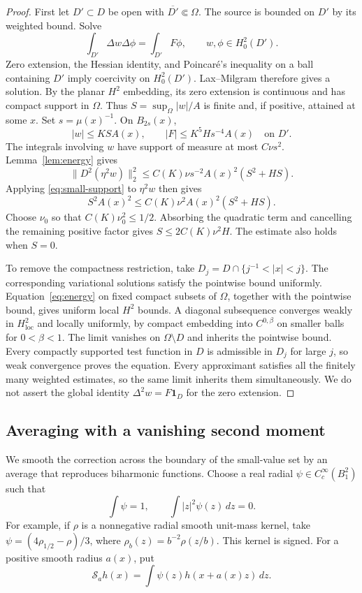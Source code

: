 \documentclass[11pt,twoside,leqno]{article}
\numberwithin{equation}{section}
\theoremstyle{definition}
\theoremstyle{remark}
\newcommand{\loc}{\mathrm{loc}}
\newcommand{\Om}{\Omega}
\begin{document}
\begin{proof}
First let $D'\subset D$ be open with $\overline{D'}\Subset\Om$.
The source is bounded on $D'$ by its weighted bound. Solve
\[
 \int_{D'}\Delta w\Delta\phi=\int_{D'}F\phi,
 \qquad w,\phi\in H^2_0(D').
\]
Zero extension, the Hessian identity, and Poincar\'e's inequality on
a ball containing $D'$ imply coercivity on $H^2_0(D')$.
Lax--Milgram therefore gives a solution. By the planar $H^2$ embedding,
its zero extension is continuous and has compact support in $\Om$.
Thus $S=\sup_\Om|w|/A$ is finite and, if positive, attained at some
$x$. Set $s=\mu(x)^{-1}$. On $B_{2s}(x)$,
\[
 |w|\le KSA(x),\qquad |F|\le K^5Hs^{-4}A(x)\quad\text{on }D'.
\]
The integrals involving $w$ have support of measure at most $C\nu s^2$.
Lemma~\ref{lem:energy} gives
\[
 \|D^2(\eta^2w)\|_2^2
 \le C(K)\nu s^{-2}A(x)^2(S^2+HS).
\]
Applying \eqref{eq:small-support} to $\eta^2w$ then gives
\[
 S^2A(x)^2\le C(K)\nu^2A(x)^2(S^2+HS).
\]
Choose $\nu_0$ so that $C(K)\nu_0^2\le1/2$. Absorbing the quadratic
term and cancelling the remaining positive factor gives
$S\le2C(K)\nu^2H$. The estimate also holds when $S=0$.

To remove the compactness restriction, take
$D_j=D\cap\{j^{-1}<|x|<j\}$. The corresponding variational solutions
satisfy the pointwise bound uniformly. Equation~\eqref{eq:energy}
on fixed compact subsets of $\Om$, together with the pointwise bound,
gives uniform local $H^2$ bounds. A diagonal subsequence converges weakly
in $H^2_{\loc}$ and locally uniformly, by compact embedding into
$C^{0,\beta}$ on smaller balls for $0<\beta<1$.
The limit vanishes on $\Om\setminus D$ and inherits the pointwise
bound. Every compactly supported test function in $D$ is admissible
in $D_j$ for large $j$, so weak convergence proves the equation.
Every approximant satisfies all the finitely many weighted estimates,
so the same limit inherits them simultaneously. We do not assert the
global identity $\Delta^2w=F\mathbf1_D$ for the zero extension.
\end{proof}

\subsection{Averaging with a vanishing second moment}

We smooth the correction across the boundary of the small-value set
by an average that reproduces biharmonic functions.
Choose a real radial $\psi\in C_c^\infty(B_1^2)$ such that
\begin{equation}\label{eq:moments}
 \int\psi=1,\qquad \int|z|^2\psi(z)\,dz=0.
\end{equation}
For example, if $\rho$ is a nonnegative radial smooth unit-mass kernel,
take $\psi=(4\rho_{1/2}-\rho)/3$, where
$\rho_b(z)=b^{-2}\rho(z/b)$. This kernel is signed.
For a positive smooth radius $a(x)$, put
\[
 \mathcal S_ah(x)=\int\psi(z)h(x+a(x)z)\,dz.
\]
\end{document}
